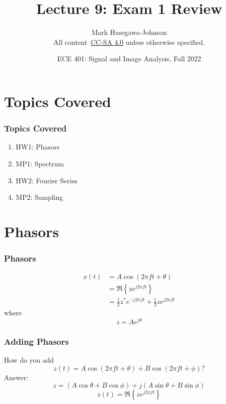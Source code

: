 \documentclass{beamer}
\title{Lecture 9: Exam 1 Review}
\author{Mark Hasegawa-Johnson\\All content~\href{https://creativecommons.org/licenses/by-sa/4.0/}{CC-SA 4.0} unless otherwise specified.}
\date{ECE 401: Signal and Image Analysis, Fall 2022}
\begin{document}
\begin{frame}
  \maketitle
\end{frame}

\begin{frame}
  \tableofcontents
\end{frame}

\section[Topics]{Topics Covered}
\setcounter{subsection}{1}

\begin{frame}
  \frametitle{Topics Covered}

  \begin{enumerate}
  \item HW1: Phasors
  \item MP1: Spectrum
  \item HW2: Fourier Series
  \item MP2: Sampling
  \end{enumerate}
\end{frame}

\section[Phasors]{Phasors}
\setcounter{subsection}{1}

\begin{frame}
  \frametitle{Phasors}

  \begin{align*}
    x(t) &= A \cos\left(2\pi f t+\theta\right) \\
    &= \Re\left\{ze^{j2\pi ft}\right\}\\
    &= \frac{1}{2}z^*e^{-j2\pi ft} + \frac{1}{2}z e^{j2\pi ft}
  \end{align*}
  where
  \[
  z = Ae^{j\theta}
  \]
\end{frame}

\begin{frame}
  \frametitle{Adding Phasors}

  How do you add
  \[
  z(t) = A\cos\left(2\pi ft+\theta\right) + B\cos\left(2\pi ft+\phi\right)?
  \]
  Answer:
  \[
  z = (A\cos\theta+B\cos\phi) + j(A\sin\theta+B\sin\phi)
  \]
  \[
  z(t) = \Re\left\{z e^{j2\pi ft}\right\}
  \]
\end{frame}
\end{document}
